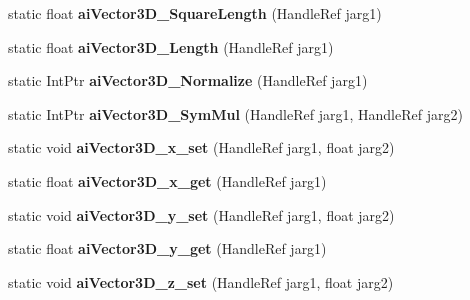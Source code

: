 \begin{DoxyCompactItemize}
\item 
\hypertarget{class_assimp_p_i_n_v_o_k_e_add5c5bcfbd98295c4cf9672350f64833}{static float {\bfseries ai\+Vector3\+D\+\_\+\+Square\+Length} (Handle\+Ref jarg1)}\label{class_assimp_p_i_n_v_o_k_e_add5c5bcfbd98295c4cf9672350f64833}

\item 
\hypertarget{class_assimp_p_i_n_v_o_k_e_a1f81cc29d8479ed29a08556d21de51dd}{static float {\bfseries ai\+Vector3\+D\+\_\+\+Length} (Handle\+Ref jarg1)}\label{class_assimp_p_i_n_v_o_k_e_a1f81cc29d8479ed29a08556d21de51dd}

\item 
\hypertarget{class_assimp_p_i_n_v_o_k_e_a8048b2b702a40e86cf0d4f20d06521e7}{static Int\+Ptr {\bfseries ai\+Vector3\+D\+\_\+\+Normalize} (Handle\+Ref jarg1)}\label{class_assimp_p_i_n_v_o_k_e_a8048b2b702a40e86cf0d4f20d06521e7}

\item 
\hypertarget{class_assimp_p_i_n_v_o_k_e_a8b983fc693cd30144aa8750534da28de}{static Int\+Ptr {\bfseries ai\+Vector3\+D\+\_\+\+Sym\+Mul} (Handle\+Ref jarg1, Handle\+Ref jarg2)}\label{class_assimp_p_i_n_v_o_k_e_a8b983fc693cd30144aa8750534da28de}

\item 
\hypertarget{class_assimp_p_i_n_v_o_k_e_ab78e2e593ab52a158f21e48e54d8fba6}{static void {\bfseries ai\+Vector3\+D\+\_\+x\+\_\+set} (Handle\+Ref jarg1, float jarg2)}\label{class_assimp_p_i_n_v_o_k_e_ab78e2e593ab52a158f21e48e54d8fba6}

\item 
\hypertarget{class_assimp_p_i_n_v_o_k_e_acd824a389c18418cf5225852f6bc5ffe}{static float {\bfseries ai\+Vector3\+D\+\_\+x\+\_\+get} (Handle\+Ref jarg1)}\label{class_assimp_p_i_n_v_o_k_e_acd824a389c18418cf5225852f6bc5ffe}

\item 
\hypertarget{class_assimp_p_i_n_v_o_k_e_af7f4f965f6fddc7f0a20134294377416}{static void {\bfseries ai\+Vector3\+D\+\_\+y\+\_\+set} (Handle\+Ref jarg1, float jarg2)}\label{class_assimp_p_i_n_v_o_k_e_af7f4f965f6fddc7f0a20134294377416}

\item 
\hypertarget{class_assimp_p_i_n_v_o_k_e_a1f30ace0fdf39c73a474a3086b603b23}{static float {\bfseries ai\+Vector3\+D\+\_\+y\+\_\+get} (Handle\+Ref jarg1)}\label{class_assimp_p_i_n_v_o_k_e_a1f30ace0fdf39c73a474a3086b603b23}

\item 
\hypertarget{class_assimp_p_i_n_v_o_k_e_adde9b1a3fe6586b7e3508902c6c18fa1}{static void {\bfseries ai\+Vector3\+D\+\_\+z\+\_\+set} (Handle\+Ref jarg1, float jarg2)}\label{class_assimp_p_i_n_v_o_k_e_adde9b1a3fe6586b7e3508902c6c18fa1}


\end{DoxyCompactItemize}
